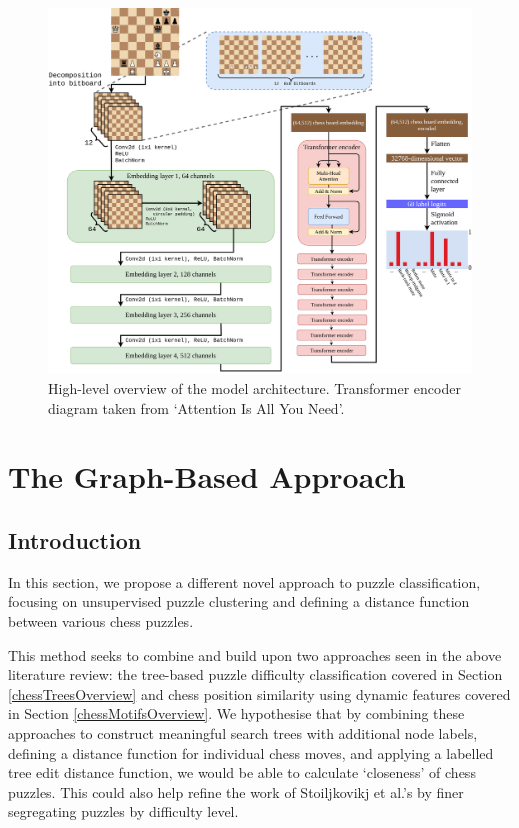 \begin{figure}[H]
        \centering
        \includegraphics[width=\textwidth]{project/img/ml_diagram.png}
        \caption{High-level overview of the model architecture. Transformer encoder diagram taken from `Attention Is All You Need'.\cite{attention}}
        \label{MLDiagram}
\end{figure}


\section{The Graph-Based Approach}

\subsection{Introduction}

In this section, we propose a different novel approach to puzzle
classification, focusing on unsupervised puzzle clustering and defining a
distance function between various chess puzzles.

This method seeks to combine and build upon two approaches seen in the above
literature review: the tree-based puzzle difficulty classification
\cite{chessTrees} covered in Section \ref{chessTreesOverview} and chess
position similarity using dynamic features \cite{chessMotifs} covered in
Section \ref{chessMotifsOverview}. We hypothesise that by combining these
approaches to construct meaningful search trees with additional node labels,
defining a distance function for individual chess moves, and applying a
labelled tree edit distance function,\cite{editDistTrees} we would be able to
calculate `closeness' of chess puzzles. This could also help refine the work of
Stoiljkovikj et al.\@'s by finer segregating puzzles by difficulty level.

